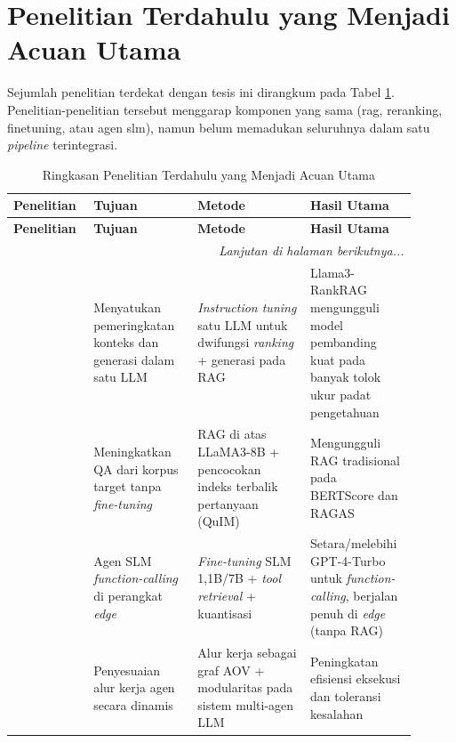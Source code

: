 \section{Penelitian Terdahulu yang Menjadi Acuan Utama}
Sejumlah penelitian terdekat dengan tesis ini dirangkum pada Tabel \ref{tab:tinjauan-pustaka}. Penelitian-penelitian tersebut menggarap komponen yang sama (\gls{rag}, \gls{reranking}, \gls{finetuning}, atau agen \gls{slm}), namun belum memadukan seluruhnya dalam satu \textit{pipeline} terintegrasi.

\begin{longtable}{p{0.16\linewidth} p{0.24\linewidth} p{0.26\linewidth} p{0.24\linewidth}}
    \caption{Ringkasan Penelitian Terdahulu yang Menjadi Acuan Utama}
    \label{tab:tinjauan-pustaka} \\
    \hline
    \textbf{Penelitian} & \textbf{Tujuan} & \textbf{Metode} & \textbf{Hasil Utama} \\
    \hline
    \endfirsthead
    \hline
    \textbf{Penelitian} & \textbf{Tujuan} & \textbf{Metode} & \textbf{Hasil Utama} \\
    \hline
    \endhead
    \hline
    \multicolumn{4}{r}{\textit{Lanjutan di halaman berikutnya...}} \\
    \endfoot
    \hline
    \endlastfoot

    \citet{yu2024rankrag} &
    Menyatukan pemeringkatan konteks dan generasi dalam satu LLM &
    \textit{Instruction tuning} satu LLM untuk dwifungsi \textit{ranking} + generasi pada RAG &
    Llama3-RankRAG mengungguli model pembanding kuat pada banyak tolok ukur padat pengetahuan \\
    \hline

    \citet{saha2024quimrag} &
    Meningkatkan QA dari korpus target tanpa \textit{fine-tuning} &
    RAG di atas LLaMA3-8B + pencocokan indeks terbalik pertanyaan (QuIM) &
    Mengungguli RAG tradisional pada BERTScore dan RAGAS \\
    \hline

    \citet{erdogan2024tinyagent} &
    Agen SLM \textit{function-calling} di perangkat \textit{edge} &
    \textit{Fine-tuning} SLM 1,1B/7B + \textit{tool retrieval} + kuantisasi &
    Setara/melebihi GPT-4-Turbo untuk \textit{function-calling}, berjalan penuh di \textit{edge} (tanpa RAG) \\
    \hline

    \citet{niu2025flow} &
    Penyesuaian alur kerja agen secara dinamis &
    Alur kerja sebagai graf AOV + modularitas pada sistem multi-agen LLM &
    Peningkatan efisiensi eksekusi dan toleransi kesalahan \\
    \hline


\end{longtable}
